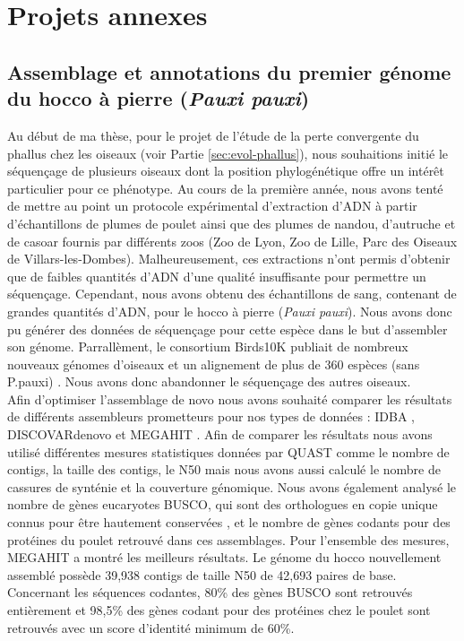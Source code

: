 \chapter{Projets annexes}
{\hypersetup{linkcolor=GREYDARK}\minitoc}
\label{chap:annexes}

\section{Assemblage et annotations du premier génome du hocco à pierre (\textit{Pauxi pauxi})}
\label{annexe:hocco}

Au début de ma thèse, pour le projet de l'étude de la perte convergente du phallus chez les oiseaux (voir Partie \ref{sec:evol-phallus}), nous souhaitions initié le séquençage de plusieurs oiseaux dont la position phylogénétique offre un intérêt particulier pour ce phénotype. Au cours de la première année, nous avons tenté de mettre au point un protocole expérimental d’extraction d’ADN à partir d’échantillons de plumes de poulet ainsi que des plumes de nandou, d’autruche et de casoar fournis par différents zoos (Zoo de Lyon, Zoo de Lille, Parc des Oiseaux de Villars-les-Dombes). Malheureusement, ces extractions n’ont permis d’obtenir que de faibles quantités d’ADN d’une qualité insuffisante pour permettre un séquençage. Cependant, nous avons obtenu des échantillons de sang, contenant de grandes quantités d’ADN, pour le hocco à pierre (\textit{Pauxi pauxi}). Nous avons donc pu générer des données de séquençage pour cette espèce dans le but d'assembler son génome. Parrallèment, le consortium Birds10K publiait de nombreux nouveaux génomes d'oiseaux et un alignement de plus de 360 espèces (sans P.pauxi) \citep{feng_dense_2020}. Nous avons donc abandonner le séquençage des autres oiseaux.\\

Afin d’optimiser l’assemblage de novo nous avons souhaité comparer les résultats de différents assembleurs prometteurs pour nos types de données : IDBA \citep{peng_idba_2010},  DISCOVARdenovo \citep{weisenfeld_comprehensive_2014} et MEGAHIT \citep{li_megahit_2015}. Afin de comparer les résultats nous avons utilisé différentes mesures statistiques données par QUAST \citep{gurevich_quast_2013} comme le nombre de contigs, la taille des contigs, le N50 mais nous avons aussi calculé le nombre de cassures de synténie et la couverture génomique. Nous avons également analysé le nombre de gènes eucaryotes BUSCO, qui sont des orthologues en copie unique connus pour être hautement conservées \citep{simao_busco_2015}, et le nombre de gènes codants pour des protéines du poulet retrouvé dans ces assemblages. Pour l’ensemble des mesures, MEGAHIT a montré les meilleurs résultats. Le génome du hocco nouvellement assemblé possède 39,938 contigs de taille N50 de 42,693 paires de base. Concernant les séquences codantes, 80\% des gènes BUSCO sont retrouvés entièrement et 98,5\% des gènes codant pour des protéines chez le poulet sont retrouvés avec un score d’identité minimum de 60\%. \\

